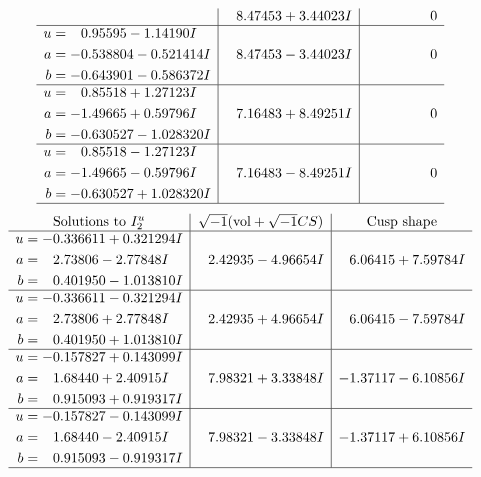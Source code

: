 \documentclass[1p]{elsarticle_modified}
\theoremstyle{definition}
\newcommand{\I}{\sqrt{-1}}
\begin{document}
$$\begin{array}{c|c|c}
 & \phantom{-}8.47453 + 3.44023 I & \phantom{-0.000000 } 0 \\ \hline\begin{aligned}
u &= \phantom{-}0.95595 - 1.14190 I \\
a &= -0.538804 - 0.521414 I \\
b &= -0.643901 - 0.586372 I\end{aligned}
 & \phantom{-}8.47453 - 3.44023 I & \phantom{-0.000000 } 0 \\ \hline\begin{aligned}
u &= \phantom{-}0.85518 + 1.27123 I \\
a &= -1.49665 + 0.59796 I \\
b &= -0.630527 - 1.028320 I\end{aligned}
 & \phantom{-}7.16483 + 8.49251 I & \phantom{-0.000000 } 0 \\ \hline\begin{aligned}
u &= \phantom{-}0.85518 - 1.27123 I \\
a &= -1.49665 - 0.59796 I \\
b &= -0.630527 + 1.028320 I\end{aligned}
 & \phantom{-}7.16483 - 8.49251 I & \phantom{-0.000000 } 0\\
 \hline 
 \end{array}$$\newpage$$\begin{array}{c|c|c}  
\text{Solutions to }I^u_{2}& \I (\text{vol} + \sqrt{-1}CS) & \text{Cusp shape}\\
 \hline 
\begin{aligned}
u &= -0.336611 + 0.321294 I \\
a &= \phantom{-}2.73806 - 2.77848 I \\
b &= \phantom{-}0.401950 - 1.013810 I\end{aligned}
 & \phantom{-}2.42935 - 4.96654 I & \phantom{-}6.06415 + 7.59784 I \\ \hline\begin{aligned}
u &= -0.336611 - 0.321294 I \\
a &= \phantom{-}2.73806 + 2.77848 I \\
b &= \phantom{-}0.401950 + 1.013810 I\end{aligned}
 & \phantom{-}2.42935 + 4.96654 I & \phantom{-}6.06415 - 7.59784 I \\ \hline\begin{aligned}
u &= -0.157827 + 0.143099 I \\
a &= \phantom{-}1.68440 + 2.40915 I \\
b &= \phantom{-}0.915093 + 0.919317 I\end{aligned}
 & \phantom{-}7.98321 + 3.33848 I & -1.37117 - 6.10856 I \\ \hline\begin{aligned}
u &= -0.157827 - 0.143099 I \\
a &= \phantom{-}1.68440 - 2.40915 I \\
b &= \phantom{-}0.915093 - 0.919317 I\end{aligned}
 & \phantom{-}7.98321 - 3.33848 I & -1.37117 + 6.10856 I\\
 \hline 
 \end{array}$$\newpage\newpage\renewcommand{\arraystretch}{1}
\end{document}
